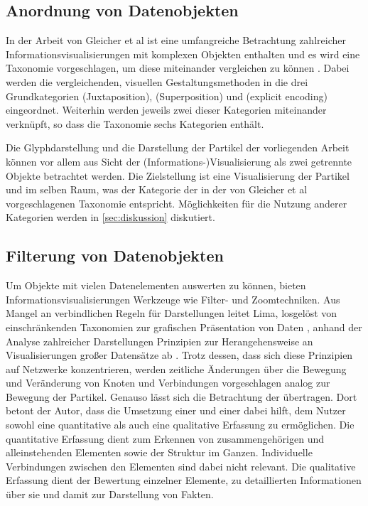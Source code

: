 \subsection*{Anordnung von Datenobjekten}\label{sec:related-visAnordnung}
In der Arbeit von Gleicher et al ist eine umfangreiche Betrachtung zahlreicher Informationsvisualisierungen mit komplexen Objekten enthalten und es wird eine Taxonomie vorgeschlagen, um diese miteinander vergleichen zu können \cite{gleicher2011visualComparison}. Dabei werden die vergleichenden, visuellen Gestaltungsmethoden in die drei Grundkategorien  (Juxtaposition),  (Superposition) und  (explicit encoding) eingeordnet. Weiterhin werden jeweils zwei dieser Kategorien miteinander verknüpft, so dass die Taxonomie sechs Kategorien enthält. %

Die Glyphdarstellung und die Darstellung der Partikel der vorliegenden Arbeit können vor allem aus Sicht der (Informations-)Visualisierung als zwei getrennte Objekte betrachtet werden. Die Zielstellung ist eine Visualisierung der Partikel und  im selben Raum, was der Kategorie der  in der von Gleicher et al vorgeschlagenen Taxonomie entspricht. Möglichkeiten für die Nutzung anderer Kategorien werden in \autoref{sec:diskussion} diskutiert. %

\subsection*{Filterung von Datenobjekten}\label{sec:related-visFilter}
Um Objekte mit vielen Datenelementen auswerten zu können, bieten Informationsvisualisierungen Werkzeuge wie Filter- und Zoomtechniken. Aus Mangel an verbindlichen Regeln für Darstellungen leitet Lima, losgelöst von einschränkenden Taxonomien zur grafischen Präsentation von Daten \cite{brinton1914graphicMethods}, anhand der Analyse zahlreicher Darstellungen \cite{lima2015visualComplexity_web} Prinzipien zur Herangehensweise an Visualisierungen großer Datensätze ab \cite[S.~81-95]{lima2013visualComplexity}. Trotz dessen, dass sich diese Prinzipien auf Netzwerke konzentrieren, werden zeitliche Änderungen über die Bewegung und Veränderung von Knoten und Verbindungen vorgeschlagen analog zur Bewegung der Partikel. Genauso lässt sich die Betrachtung der  übertragen. Dort betont der Autor, dass die Umsetzung einer  und einer  dabei hilft, dem Nutzer sowohl eine quantitative als auch eine qualitative Erfassung zu ermöglichen. Die quantitative Erfassung dient zum Erkennen von zusammengehörigen und alleinstehenden Elementen sowie der Struktur im Ganzen. Individuelle Verbindungen zwischen den Elementen sind dabei nicht relevant. Die qualitative Erfassung dient der Bewertung einzelner Elemente, zu detaillierten Informationen über sie und damit zur Darstellung von Fakten. %


